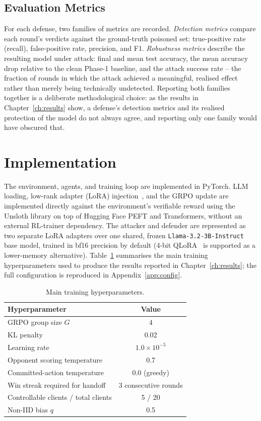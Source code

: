 \subsection{Evaluation Metrics}
For each defense, two families of metrics are recorded. \emph{Detection metrics} compare each round's verdicts against the ground-truth poisoned set: true-positive rate (recall), false-positive rate, precision, and F1. \emph{Robustness metrics} describe the resulting model under attack: final and mean test accuracy, the mean accuracy drop relative to the clean Phase-1 baseline, and the attack success rate -- the fraction of rounds in which the attack achieved a meaningful, realised effect rather than merely being technically undetected. Reporting both families together is a deliberate methodological choice: as the results in Chapter~\ref{ch:results} show, a defense's detection metrics and its realised protection of the model do not always agree, and reporting only one family would have obscured that.

\section{Implementation}
\label{sec:method-impl}

The environment, agents, and training loop are implemented in PyTorch. LLM loading, low-rank adapter (LoRA) injection~\citep{lora2022}, and the GRPO update are implemented directly against the environment's verifiable reward using the Unsloth library on top of Hugging Face PEFT and Transformers, without an external RL-trainer dependency. The attacker and defender are represented as two separate LoRA adapters over one shared, frozen \texttt{Llama-3.2-3B-Instruct} base model, trained in bf16 precision by default (4-bit QLoRA~\citep{qlora2023} is supported as a lower-memory alternative). Table~\ref{tab:method-hparams} summarises the main training hyperparameters used to produce the results reported in Chapter~\ref{ch:results}; the full configuration is reproduced in Appendix~\ref{app:config}.

\begin{table}[h]
\centering
\caption{Main training hyperparameters.}
\label{tab:method-hparams}
\begin{tabular}{|l|c|}
\hline
\textbf{Hyperparameter} & \textbf{Value} \\
\hline
GRPO group size $G$ & 4 \\
\hline
KL penalty & 0.02 \\
\hline
Learning rate & $1.0 \times 10^{-5}$ \\
\hline
Opponent scoring temperature & 0.7 \\
\hline
Committed-action temperature & 0.0 (greedy) \\
\hline
Win streak required for handoff & 3 consecutive rounds \\
\hline
Controllable clients / total clients & 5 / 20 \\
\hline
Non-IID bias $q$ & 0.5 \\
\hline
\end{tabular}
\end{table}

